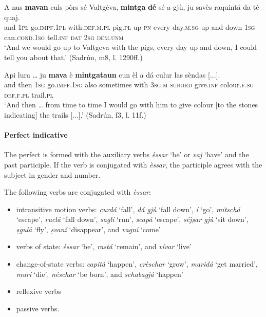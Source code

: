 \ea\label{ex:impf:4}
\gll    A nus \textbf{mavan} culs pòrs sé Valtgèva, \textbf{mintga} \textbf{dé} sé a gjù, ju savès raquintá da té quaj.\\
and \textsc{1pl}  go.\textsc{impf.1pl} with.\textsc{def.m.pl} pig.\textsc{pl} up \textsc{pn} every day.\textsc{m.sg} up and down  \textsc{1sg}  can.\textsc{cond.1sg}  tell.\textsc{inf}  \textsc{dat}  \textsc{2sg} \textsc{dem.unm}\\
\glt `And we would go up to Valtgeva with the pigs, every day up and down, I could tell you about that.' (Sadrún, m8, l. 1290ff.)
\z

\ea\label{ex:impf:5}
\gll  Api lura … ju \textbf{mava} è \textbf{mintgataun} cun èl a dá culur las sèndas [...].\\
and then {} \textsc{1sg} go.\textsc{impf.1sg} also sometimes with \textsc{3sg.m} \textsc{subord} give.\textsc{inf} colour.\textsc{f.sg} \textsc{def.f.pl} trail.\textsc{pl}\\
\glt `And then … from time to time I would go with him to give colour [to the stones indicating] the trails [...].' (Sadrún, f3, l. 11f.)
\z


\paragraph{Perfect indicative}
The perfect is formed with the auxiliary verbs \textit{èssar} `be' or \textit{vaj} `have' and the past participle. If the verb is conjugated with \textit{èssar}, the participle agrees with the subject in gender and number.

The following verbs are conjugated with \textit{èssar}:

\begin{itemize}
	
	\item intransitive motion verbs: \textit{curdá} `fall', \textit{dá gjù} `fall down', \textit{í} `go', \textit{mitschá} `escape', \textit{ruclá} `fall down', \textit{saglí} `run', \textit{scapá} `escape', \textit{séjṣar gjù} `sit down', \textit{ṣgulá} `fly', \textit{ṣvaní} `disappear', and \textit{vagní} `come'
	\item verbs of state: \textit{èssar} `be', \textit{rastá} `remain', and \textit{vívar} `live'
	\item change-of-state verbs: \textit{capitá} `happen',  \textit{crèschar} `grow', \textit{maridá} `get married', \textit{murí} `die', \textit{néschar} `be born', and \textit{schabagjá} `happen'
	\item reflexive verbs
	\item passive verbs.
	\end{itemize}

